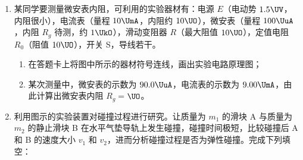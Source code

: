 \documentclass[\gkver]{gaokaozhenti}
\begin{document}
\begin{enumerate}
\item
某同学要测量微安表内阻，可利用的实验器材有：电源 $E$（电动势 $1.5\UV$，内阻很小），电流表（量程 $10\UmA$，内阻约 $10\UO$），微安表（量程 $100\UuA$，内阻 $R_{g}$ 待测，约 $1\UkO$），滑动变阻器 $R$（最大阻值 $10\UO$），定值电阻 $R_{0}$（阻值 $10\UO$），开关 S，导线若干。
\begin{enumerate}
	\item
	在答题卡上将图中所示的器材符号连线，画出实验电路原理图\tkanswer[2cm]{}；
	\item
	某次测量中，微安表的示数为 $90.0\UuA$，电流表的示数为 $9.00\UmA$，由此计算出微安表内阻 $R_{g}=$$\UO$。
\end{enumerate}



\item
利用图示的实验装置对碰撞过程进行研究。让质量为 $m_{1}$ 的滑块 A 与质量为 $m_{2}$ 的静止滑块 B 在水平气垫导轨上发生碰撞，碰撞时间极短，比较碰撞后 A 和 B 的速度大小 $v_{1}$ 和 $v_{2}$，进而分析碰撞过程是否为弹性碰撞。完成下列填空：


\end{enumerate}
\end{document}
